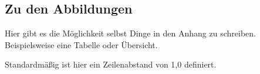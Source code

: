
\subsection{Zu den Abbildungen}

Hier gibt es die Möglichkeit selbst Dinge in den Anhang zu schreiben. Beispielsweise eine Tabelle oder Übersicht.
\newline

Standardmäßig ist hier ein Zeilenabstand von 1,0 definiert.
\newline

\blindtext
